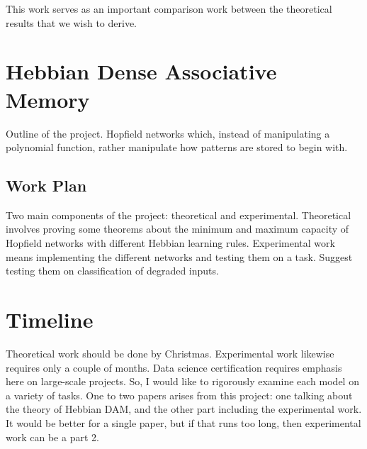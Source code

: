 \documentclass{article}
\theoremstyle{definition}
\begin{document}
This work serves as an important comparison work between the theoretical
results that we wish to derive.

\section{Hebbian Dense Associative Memory}\label{sec:hebbian-dam}

Outline of the project. Hopfield networks which, instead of
manipulating a polynomial
function, rather manipulate how patterns are stored to begin with.

\subsection{Work Plan}\label{sec:work-plan}

Two main components of the project: theoretical and experimental. Theoretical
involves proving some theorems about the minimum and maximum capacity of
Hopfield networks with different Hebbian learning rules. Experimental work
means implementing the different networks and testing them on a task. Suggest
testing them on classification of degraded inputs.

\section{Timeline}\label{sec:timeline}

Theoretical work should be done by Christmas. Experimental work likewise
requires only a couple of months. Data science certification requires emphasis
here on large-scale projects. So, I would like to rigorously examine
each model on a variety of tasks. One to two papers arises from this project:
one talking about the theory of Hebbian DAM, and the other part including
the experimental work. It would be better for a single paper, but if that
runs too long, then experimental work can be a part 2.

\printbibliography
\end{document}
